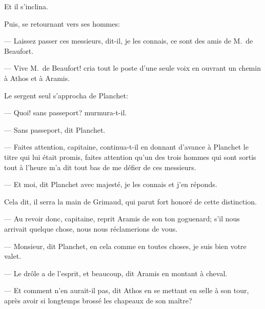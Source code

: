 Et il s'inclina.

Puis, se retournant vers ses hommes:

— Laissez passer ces messieurs, dit-il, je les connais, ce sont des amis de M.~de Beaufort.

— Vive M.~de Beaufort! cria tout le poste d'une seule voix en ouvrant un chemin à Athos et à Aramis.

Le sergent seul s'approcha de Planchet:

— Quoi! sans passeport? murmura-t-il.

— Sans passeport, dit Planchet.

— Faites attention, capitaine, continua-t-il en donnant d'avance à Planchet le titre qui lui était promis, faites attention qu'un des trois hommes qui sont sortis tout à l'heure m'a dit tout bas de me défier de ces messieurs.

— Et moi, dit Planchet avec majesté, je les connais et j'en réponds.

Cela dit, il serra la main de Grimaud, qui parut fort honoré de cette distinction.

— Au revoir donc, capitaine, reprit Aramis de son ton goguenard; s'il nous arrivait quelque chose, nous nous réclamerions de vous.

— Monsieur, dit Planchet, en cela comme en toutes choses, je suis bien votre valet.

— Le drôle a de l'esprit, et beaucoup, dit Aramis en montant à cheval.

— Et comment n'en aurait-il pas, dit Athos en se mettant en selle à son tour, après avoir si longtemps brossé les chapeaux de son maître?